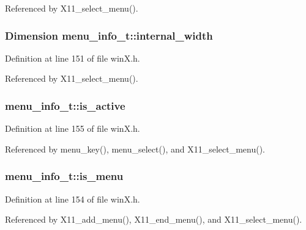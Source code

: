 Referenced by X11\+\_\+select\+\_\+menu().

\hypertarget{structmenu__info__t_a6e17292848a33ea6a90687c997786a43}{
\subsubsection[{internal\+\_\+width}]{\setlength{\rightskip}{0pt plus 5cm}Dimension menu\+\_\+info\+\_\+t\+::internal\+\_\+width}}\label{structmenu__info__t_a6e17292848a33ea6a90687c997786a43}


Definition at line 151 of file win\+X.\+h.



Referenced by X11\+\_\+select\+\_\+menu().

\hypertarget{structmenu__info__t_aa6ca6a4d2dff17cfc00063110467bb33}{
\subsubsection[{is\+\_\+active}]{ menu\+\_\+info\+\_\+t\+::is\+\_\+active}}\label{structmenu__info__t_aa6ca6a4d2dff17cfc00063110467bb33}


Definition at line 155 of file win\+X.\+h.



Referenced by menu\+\_\+key(), menu\+\_\+select(), and X11\+\_\+select\+\_\+menu().

\hypertarget{structmenu__info__t_acdaeddbe7e241346d454cf07ad6ef2bb}{
\subsubsection[{is\+\_\+menu}]{ menu\+\_\+info\+\_\+t\+::is\+\_\+menu}}\label{structmenu__info__t_acdaeddbe7e241346d454cf07ad6ef2bb}


Definition at line 154 of file win\+X.\+h.



Referenced by X11\+\_\+add\+\_\+menu(), X11\+\_\+end\+\_\+menu(), and X11\+\_\+select\+\_\+menu().


